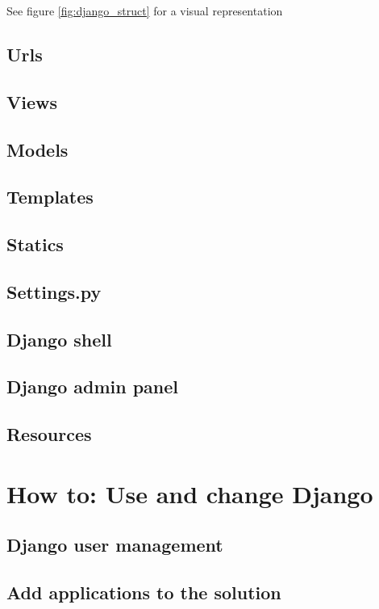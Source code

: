 \documentclass{report}
\begin{document}
See figure \ref{fig:django_struct} for a visual representation

\subsection{Urls} \label{django:urls}

\subsection{Views} \label{django:views}
\subsection{Models} \label{django:models}
\subsection{Templates} \label{django:templates}
\subsection{Statics} \label{django:static}
\subsection{Settings.py} \label{django:settings}
\subsection{Django shell} \label{django:shell}
\subsection{Django admin panel} \label{django:adminpanel}
\subsection{Resources} \label{django:resources}

\newpage
\section{How to: Use and change Django} \label{sec:use_and_change_django}
\subsection{Django user management} 
\subsection{Add applications to the solution}
\end{document}
